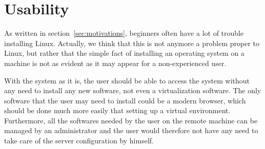 \section{Usability}
%
As written in section~\ref{sec:motivations}, beginners often have a lot of trouble 
installing Linux. Actually, we think that this is not anymore a problem proper to Linux, 
but rather that the simple fact of installing an operating system on a machine is not 
as evident as it may appear for a non-experienced user.

With the system as it is, the user should be able to access the system without 
any need to install any new software, not even a virtualization software. The only 
software that the user may need to install could be a modern browser, which 
should be done much more easily that setting up a virtual environment. Furthermore, 
all the softwares needed by the user on the remote machine can be managed by 
an administrator and the user would therefore not have any need to take care of the 
server configuration by himself.

